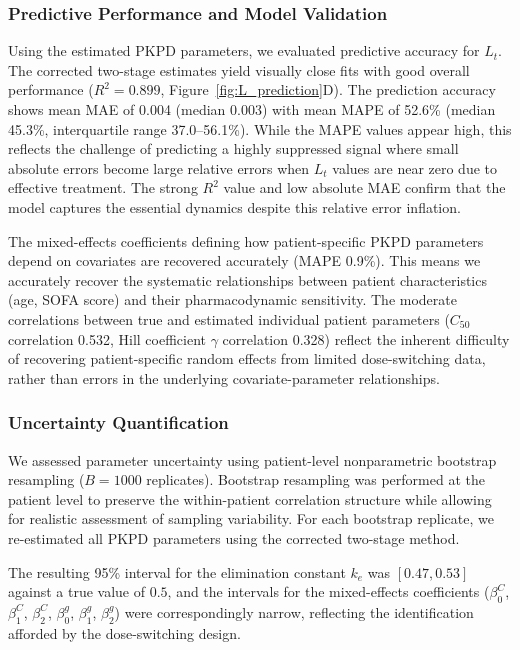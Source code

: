\subsubsection{Predictive Performance and Model Validation}

Using the estimated PKPD parameters, we evaluated predictive accuracy for $L_t$. The corrected two-stage estimates yield visually close fits with good overall performance ($R^2 = 0.899$, Figure~\ref{fig:L_prediction}D). The prediction accuracy shows mean MAE of 0.004 (median 0.003) with mean MAPE of 52.6\% (median 45.3\%, interquartile range 37.0--56.1\%). While the MAPE values appear high, this reflects the challenge of predicting a highly suppressed signal where small absolute errors become large relative errors when $L_t$ values are near zero due to effective treatment. The strong $R^2$ value and low absolute MAE confirm that the model captures the essential dynamics despite this relative error inflation.

The mixed-effects coefficients defining how patient-specific PKPD parameters depend on covariates are recovered accurately (MAPE 0.9\%). This means we accurately recover the systematic relationships between patient characteristics (age, SOFA score) and their pharmacodynamic sensitivity. The moderate correlations between true and estimated individual patient parameters ($C_{50}$ correlation 0.532, Hill coefficient $\gamma$ correlation 0.328) reflect the inherent difficulty of recovering patient-specific random effects from limited dose-switching data, rather than errors in the underlying covariate-parameter relationships.

\subsubsection{Uncertainty Quantification}

We assessed parameter uncertainty using patient-level nonparametric bootstrap resampling ($B=1000$ replicates). Bootstrap resampling was performed at the patient level to preserve the within-patient correlation structure while allowing for realistic assessment of sampling variability. For each bootstrap replicate, we re-estimated all PKPD parameters using the corrected two-stage method.

The resulting 95\% interval for the elimination constant $k_e$ was $[0.47, 0.53]$ against a true value of $0.5$, and the intervals for the mixed-effects coefficients ($\beta^C_0$, $\beta^C_1$, $\beta^C_2$, $\beta^g_0$, $\beta^g_1$, $\beta^g_2$) were correspondingly narrow, reflecting the identification afforded by the dose-switching design.


